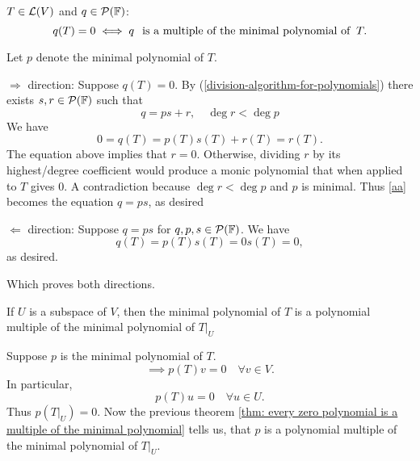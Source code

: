 \setcounter{thm}{28}
\begin{thm}
  \label{thm: every zero polynomial is a multiple of the minimal polynomial}
  $T\in \mathcal{L}(V)$ and $q \in \mathcal{P} (\mathbb{F})$: 
  \begin{equation}
    q(T)=0 \iff q \;\;\, \text{is a multiple of the minimal polynomial of}\;\; T.
  \end{equation}
\end{thm}
\begin{prf}
  Let $p$ denote the minimal polynomial of $T$.
  
  \begin{description}
    
    \item{$\Rightarrow$ direction:}{
      Suppose $q(T)=0$.
      By (\ref{division-algorithm-for-polynomials}) there exists $s,r \in \mathcal{P} (\mathbb{F})$ such that
      \begin{equation}
        q=ps+r, \quad \deg r < \deg p
      \end{equation}
      We have
      \begin{equation}
        \label{aa}
        0 = q(T) = p(T)s(T) + r(T) = r(T).
      \end{equation}
      The equation above implies that $r=0$. Otherwise, dividing $r$ by its highest\-/degree coefficient would produce a monic polynomial that when applied to $T$ gives $0$. A contradiction because $\deg r < \deg p$ and $p$ is minimal. Thus \ref{aa} becomes the equation $q=ps$, as desired
    }
    \item{$\Leftarrow$ direction:}{
      Suppose $q=ps$ for $q,p,s \in \mathcal{P}(\mathbb{F})$. We have
      \begin{equation}
        q(T) = p(T)s(T)=0s(T)=0,
      \end{equation}
      as desired. 
    }
  \end{description}
  Which proves both directions.
\end{prf}

\setcounter{thm}{30}
\begin{thm}
  \label{thm: minimal polynomial of a restriction operator}
  If $U$ is a subspace of $V$, then the minimal polynomial of $T$ is a polynomial multiple of the minimal polynomial of $\left .T \right | _{ U}$
\end{thm}
\begin{prf}
  Suppose $p$ is the minimal polynomial of $T$.
  \begin{equation}
    \implies p(T)v=0 \quad \forall v \in V.
  \end{equation}
  In particular,
  \begin{equation}
    p(T)u=0 \quad \forall u\in U.
  \end{equation} Thus $p\left( \left.T\right|_{U} \right)=0.$ Now the previous theorem
  \ref{thm: every zero polynomial is a multiple of the minimal polynomial} tells us, that $p$ is a polynomial multiple of the minimal polynomial of $\left. T \right |_U$.
\end{prf}

